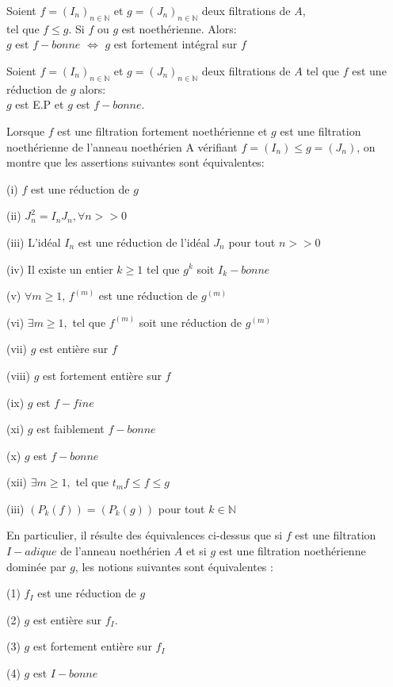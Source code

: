 \begin{moncorollaire}
	Soient $f=(I_n)_{n \in \mathbb{N}}$ et $g=(J_n)_{n \in \mathbb{N}}$ deux filtrations de $A$,\\ tel que $f \leqslant  g$.
	Si $f$ ou $g$ est noethérienne. Alors: \\
	$g$ est $f-bonne$ $\Longleftrightarrow $ $g$ est fortement intégral sur $f$
\end{moncorollaire}
\begin{maproposition}
	Soient $f=(I_n)_{n \in \mathbb{N}}$ et $g=(J_n)_{n \in \mathbb{N}}$ deux filtrations de $A$ tel que $f$ est une réduction de $g$ alors:\\
	$g$ est E.P et $g$ est $f-bonne$.
\end{maproposition}

\begin{maproposition}
	Lorsque $f$ est une filtration fortement noethérienne et $g$ est une
	filtration noethérienne de l'anneau noethérien A vérifiant $
	f=(I_{n})\leq g=(J_{n})$, on montre que les assertions suivantes sont équivalentes:
	
	(i) $f$ est une réduction de $g$
	
	(ii) $J_{n}^{2}=I_{n}J_{n},\forall n>>0$
	
	(iii) L'idéal $I_{n}$ est une réduction de l'idéal $J_{n}$ pour
	tout $n>>0$
	
	(iv) Il existe un entier $k\geq 1$ tel que $g^{k}$ soit $I_{k}-bonne$
	
	(v) $\forall m\geq 1$, $f^{(m)}$ est une réduction de $g^{(m)}$
	
	(vi) $\exists m\geq 1,$ tel que $f^{(m)}$ soit une réduction de $g^{(m)}$
	
	(vii) $g$ est entière sur $f$
	
	(viii) $g$ est fortement entière sur $f$
	
	(ix) $g$ est $f-fine$
	
	(xi) $g$ est faiblement $f-bonne$
	
	(x) $g$ est $f-bonne$
	
	(xii) $\exists m\geq 1,$ tel que $t_{m}f\leq f\leq g$
	
	(iii) $(P_{k}(f))=(P_{k}(g))$ pour tout $k\in\mathbb{N}$
	
	En particulier, il résulte des équivalences ci-dessus que si $f$ est une filtration $I-adique$ de l'anneau noethérien $A$ et si $g$ est
	une filtration noethérienne dominée par $g$, les notions suivantes
	sont équivalentes :
	
	(1) $f_{I}$ est une réduction de $g$
	
	(2) $g$ est entière sur $f_{I}$.
	
	(3) $g$ est fortement entière sur $f_{I}$
	
	(4) $g$ est $I-bonne$
	
\end{maproposition}

